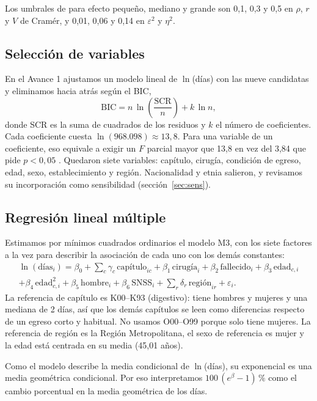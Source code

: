 \documentclass[10.5pt,a4paper,headings=small,abstract=false]{scrartcl}
\newcommand{\pct}{\,\%}
\begin{document}
Los umbrales de \citet{cohen1988} para efecto pequeño, mediano y grande son 0,1, 0,3 y 0,5 en $\rho$, $r$ y $V$ de Cramér, y 0,01, 0,06 y 0,14 en $\varepsilon^2$ y $\eta^2$.

\subsection{Selección de variables}

En el Avance 1 ajustamos un modelo lineal de $\ln$(días) con las nueve candidatas y eliminamos hacia atrás según el BIC,
\[
\mathrm{BIC}=n\,\ln\!\left(\frac{\mathrm{SCR}}{n}\right)+k\,\ln n,
\]
donde SCR es la suma de cuadrados de los residuos y $k$ el número de coeficientes. Cada coeficiente cuesta $\ln(968.098)\approx 13{,}8$. Para una variable de un coeficiente, eso equivale a exigir un $F$ parcial mayor que 13,8 en vez del 3,84 que pide $p<0{,}05$ \citep{raftery1995}. Quedaron siete variables: capítulo, cirugía, condición de egreso, edad, sexo, establecimiento y región. Nacionalidad y etnia salieron, y revisamos su incorporación como sensibilidad (sección~\ref{sec:sens}).

\subsection{Regresión lineal múltiple}

Estimamos por mínimos cuadrados ordinarios el modelo M3, con los siete factores a la vez para describir la asociación de cada uno con los demás constantes:
\begin{multline*}
\ln(\text{días}_i)=\beta_0+\sum_c\gamma_c\,\text{capítulo}_{ic}+\beta_1\,\text{cirugía}_i+\beta_2\,\text{fallecido}_i+\beta_3\,\text{edad}_{c,i}\\
+\beta_4\,\text{edad}_{c,i}^2+\beta_5\,\text{hombre}_i+\beta_6\,\text{SNSS}_i+\sum_r\delta_r\,\text{región}_{ir}+\varepsilon_i .
\end{multline*}
La referencia de capítulo es K00--K93 (digestivo): tiene hombres y mujeres y una mediana de 2 días, así que los demás capítulos se leen como diferencias respecto de un egreso corto y habitual. No usamos O00--O99 porque solo tiene mujeres. La referencia de región es la Región Metropolitana, el sexo de referencia es mujer y la edad está centrada en su media (45,01 años).

Como el modelo describe la media condicional de $\ln$(días), su exponencial es una media geométrica condicional. Por eso interpretamos $100\,(e^{\beta}-1)\pct{}$ como el cambio porcentual en la media geométrica de los días.
\end{document}
